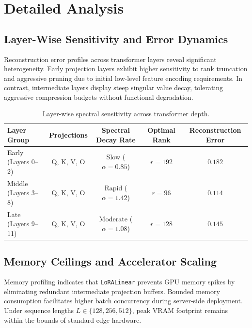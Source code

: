 \section{Detailed Analysis}

\subsection{Layer-Wise Sensitivity and Error Dynamics}
Reconstruction error profiles across transformer layers reveal significant heterogeneity. Early projection layers exhibit higher sensitivity to rank truncation and aggressive pruning due to initial low-level feature encoding requirements. In contrast, intermediate layers display steep singular value decay, tolerating aggressive compression budgets without functional degradation.

\begin{table}[H]
\centering
\small
\begin{tabular}{lcccc}
\toprule
\textbf{Layer Group} & \textbf{Projections} & \textbf{Spectral Decay Rate} & \textbf{Optimal Rank} & \textbf{Reconstruction Error} \\
\midrule
Early (Layers 0--2) & Q, K, V, O & Slow ($\alpha = 0.85$) & $r=192$ & $0.182$ \\
Middle (Layers 3--8) & Q, K, V, O & Rapid ($\alpha = 1.42$) & $r=96$ & $0.114$ \\
Late (Layers 9--11) & Q, K, V, O & Moderate ($\alpha = 1.08$) & $r=128$ & $0.145$ \\
\bottomrule
\end{tabular}
\caption{Layer-wise spectral sensitivity across transformer depth.}
\label{tab:layer_sensitivity}
\end{table}

\subsection{Memory Ceilings and Accelerator Scaling}
Memory profiling indicates that \texttt{LoRALinear} prevents GPU memory spikes by eliminating redundant intermediate projection buffers. Bounded memory consumption facilitates higher batch concurrency during server-side deployment. Under sequence lengths $L \in \{128, 256, 512\}$, peak VRAM footprint remains within the bounds of standard edge hardware.

